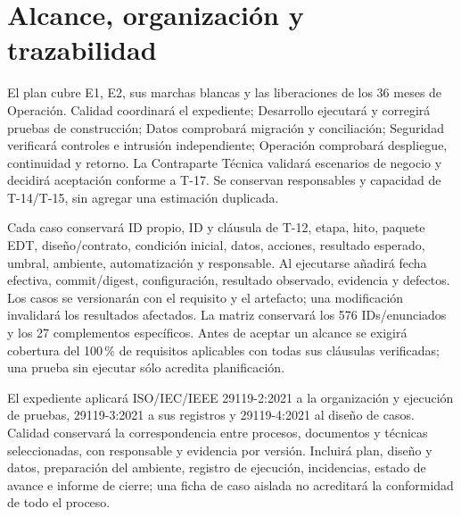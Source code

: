 \section{Alcance, organización y trazabilidad}
El plan cubre E1, E2, sus marchas blancas y las liberaciones de los 36 meses de Operación. Calidad coordinará el expediente; Desarrollo ejecutará y corregirá pruebas de construcción; Datos comprobará migración y conciliación; Seguridad verificará controles e intrusión independiente; Operación comprobará despliegue, continuidad y retorno. La Contraparte Técnica validará escenarios de negocio y decidirá aceptación conforme a T-17. Se conservan responsables y capacidad de T-14/T-15, sin agregar una estimación duplicada. \parencites[sec.~9.1--9.3]{sd9-sd9}[Diccionario de gobierno, pruebas, formación y servicio]{sd9-t14}

Cada caso conservará ID propio, ID y cláusula de T-12, etapa, hito, paquete EDT, diseño/contrato, condición inicial, datos, acciones, resultado esperado, umbral, ambiente, automatización y responsable. Al ejecutarse añadirá fecha efectiva, commit/digest, configuración, resultado observado, evidencia y defectos. Los casos se versionarán con el requisito y el artefacto; una modificación invalidará los resultados afectados. La matriz conservará los 576 IDs/enunciados y los 27 complementos específicos. Antes de aceptar un alcance se exigirá cobertura del 100\,\% de requisitos aplicables con todas sus cláusulas verificadas; una prueba sin ejecutar sólo acredita planificación.

El expediente aplicará ISO/IEC/IEEE 29119-2:2021 a la organización y ejecución de pruebas, 29119-3:2021 a sus registros y 29119-4:2021 al diseño de casos. Calidad conservará la correspondencia entre procesos, documentos y técnicas seleccionadas, con responsable y evidencia por versión. Incluirá plan, diseño y datos, preparación del ambiente, registro de ejecución, incidencias, estado de avance e informe de cierre; una ficha de caso aislada no acreditará la conformidad de todo el proceso. \parencite{sd9-29119-2,sd9-29119-3,sd9-29119-4}

